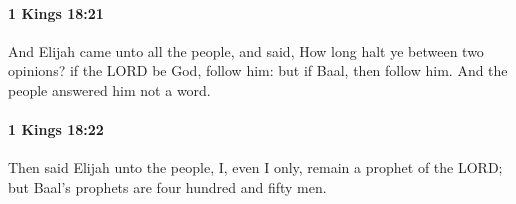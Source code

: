 		\paragraph{1 Kings 18:21} %
			\label{1KINGS-18-21}

			And Elijah came unto all the people, and said, How long halt ye between two opinions? if the LORD be God, follow him: but if Baal, then follow him. And the people answered him not a word.


		\paragraph{1 Kings 18:22} %
			\label{1KINGS-18-22}

			Then said Elijah unto the people, I, even I only, remain a prophet of the LORD; but Baal’s prophets are four hundred and fifty men.


